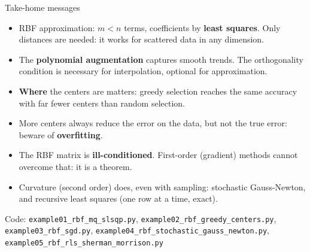 \documentclass[10pt,aspectratio=169]{beamer}
\newcommand{\hl}[1]{\textcolor{accent}{\textbf{#1}}}
\begin{document}
\begin{frame}{Take-home messages}
  \small
  \begin{itemize}
    \item RBF approximation: $m < n$ terms, coefficients by
          \hl{least squares}. Only distances are needed: it works for
          scattered data in any dimension.
    \item The \hl{polynomial augmentation} captures smooth trends. The
          orthogonality condition is necessary for interpolation, optional
          for approximation.
    \item \hl{Where} the centers are matters: greedy selection reaches the
          same accuracy with far fewer centers than random selection.
    \item More centers always reduce the error on the data, but not the true
          error: beware of \hl{overfitting}.
    \item The RBF matrix is \hl{ill-conditioned}. First-order (gradient)
          methods cannot overcome that: it is a theorem.
    \item Curvature (second order) does, even with sampling: stochastic
          Gauss-Newton, and recursive least squares (one row at a time,
          exact).
  \end{itemize}
  \vspace{0.3em}
  \small Code: \texttt{example01\_rbf\_mq\_slsqp.py}, \texttt{example02\_rbf\_greedy\_centers.py},
  \texttt{example03\_rbf\_sgd.py}, \texttt{example04\_rbf\_stochastic\_gauss\_newton.py},
  \texttt{example05\_rbf\_rls\_sherman\_morrison.py}
\end{frame}
\end{document}
